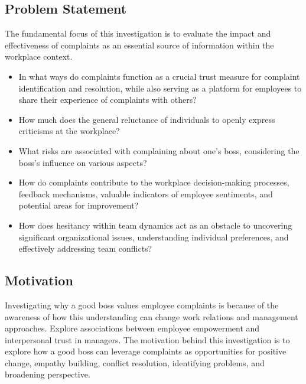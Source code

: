 \documentclass[a4paper,12pt]{article}
\begin{document}
\subsection{Problem Statement}
The fundamental focus of this investigation is to evaluate the impact and effectiveness of complaints as an essential source of information within the workplace context. 
\begin{itemize}
    \item In what ways do complaints function as a crucial trust measure for complaint identification and resolution, while also serving as a platform for employees to share their experience of complaints with others?
    \item How much does the general reluctance of individuals to openly express criticisms at the workplace?
    \item What risks are associated with complaining about one's boss, considering the boss's influence on various aspects?
    \item How do complaints contribute to the workplace decision-making processes, feedback mechanisms, valuable indicators of employee sentiments, and potential areas for improvement?
    \item How does hesitancy within team dynamics act as an obstacle to uncovering significant organizational issues, understanding individual preferences, and effectively addressing team conflicts?
\end{itemize}


\subsection{Motivation}
Investigating why a good boss values employee complaints is because of the awareness of how this understanding can change work relations and management approaches. Explore associations between employee empowerment and interpersonal trust in managers. The motivation behind this investigation is to explore how a good boss can leverage complaints as opportunities for positive change, empathy building, conflict resolution, identifying problems, and broadening perspective.    
\end{document}
